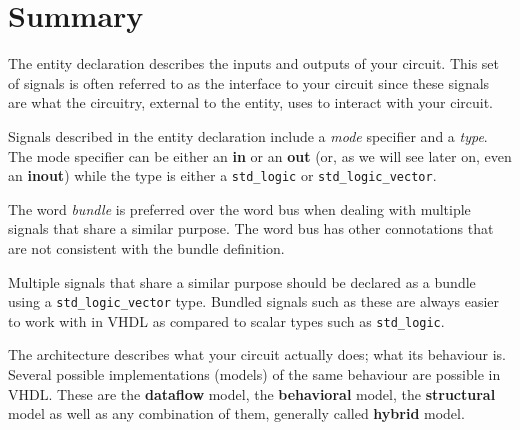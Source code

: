 \section{Summary}
\begin{my_list}
\item The entity declaration describes the inputs and outputs of your circuit. This set of signals is often referred to as the interface to your circuit since these signals are what the circuitry, external to the entity, uses to interact with your circuit.
\item Signals described in the entity declaration include a \textit{mode} specifier and a \textit{type}. The mode specifier can be either an \textbf{in} or an \textbf{out} (or, as we will see later on, even an \textbf{inout}) while the type is either a \texttt{std\_logic} or \texttt{std\_logic\_vector}.
\item The word \textit{bundle} is preferred over the word bus when dealing with multiple signals that share a similar purpose. The word bus has other connotations that are not consistent with the bundle definition.
\item Multiple signals that share a similar purpose should be declared as a bundle using a \texttt{std\_logic\_vector} type. Bundled signals such as these are always easier to work with in VHDL as compared to scalar types such as \texttt{std\_logic}.
\item The architecture describes what your circuit actually does; what its behaviour is. Several possible implementations (models) of the same behaviour are possible in VHDL. These are the \textbf{dataflow} model, the \textbf{behavioral} model, the \textbf{structural} model as well as any combination of them, generally called \textbf{hybrid} model.
\end{my_list}

